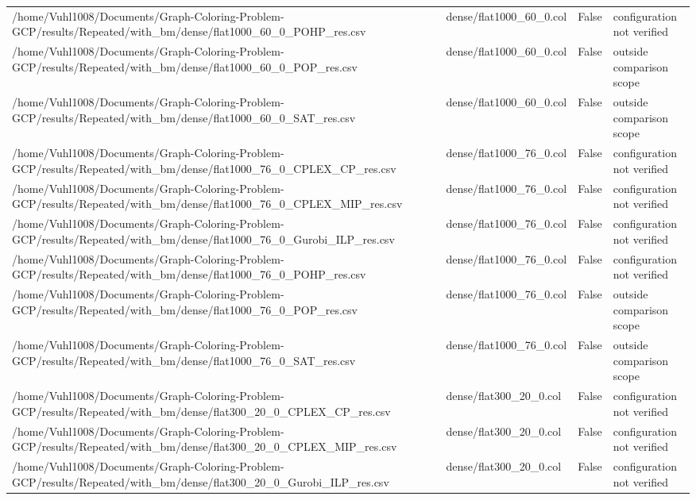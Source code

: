 \begin{table}[htbp]
\begin{tabular}{llll}
/home/Vuhl1008/Documents/Graph-Coloring-Problem-GCP/results/Repeated/with\_bm/dense/flat1000\_60\_0\_POHP\_res.csv & dense/flat1000\_60\_0.col & False & configuration not verified \\
/home/Vuhl1008/Documents/Graph-Coloring-Problem-GCP/results/Repeated/with\_bm/dense/flat1000\_60\_0\_POP\_res.csv & dense/flat1000\_60\_0.col & False & outside comparison scope \\
/home/Vuhl1008/Documents/Graph-Coloring-Problem-GCP/results/Repeated/with\_bm/dense/flat1000\_60\_0\_SAT\_res.csv & dense/flat1000\_60\_0.col & False & outside comparison scope \\
/home/Vuhl1008/Documents/Graph-Coloring-Problem-GCP/results/Repeated/with\_bm/dense/flat1000\_76\_0\_CPLEX\_CP\_res.csv & dense/flat1000\_76\_0.col & False & configuration not verified \\
/home/Vuhl1008/Documents/Graph-Coloring-Problem-GCP/results/Repeated/with\_bm/dense/flat1000\_76\_0\_CPLEX\_MIP\_res.csv & dense/flat1000\_76\_0.col & False & configuration not verified \\
/home/Vuhl1008/Documents/Graph-Coloring-Problem-GCP/results/Repeated/with\_bm/dense/flat1000\_76\_0\_Gurobi\_ILP\_res.csv & dense/flat1000\_76\_0.col & False & configuration not verified \\
/home/Vuhl1008/Documents/Graph-Coloring-Problem-GCP/results/Repeated/with\_bm/dense/flat1000\_76\_0\_POHP\_res.csv & dense/flat1000\_76\_0.col & False & configuration not verified \\
/home/Vuhl1008/Documents/Graph-Coloring-Problem-GCP/results/Repeated/with\_bm/dense/flat1000\_76\_0\_POP\_res.csv & dense/flat1000\_76\_0.col & False & outside comparison scope \\
/home/Vuhl1008/Documents/Graph-Coloring-Problem-GCP/results/Repeated/with\_bm/dense/flat1000\_76\_0\_SAT\_res.csv & dense/flat1000\_76\_0.col & False & outside comparison scope \\
/home/Vuhl1008/Documents/Graph-Coloring-Problem-GCP/results/Repeated/with\_bm/dense/flat300\_20\_0\_CPLEX\_CP\_res.csv & dense/flat300\_20\_0.col & False & configuration not verified \\
/home/Vuhl1008/Documents/Graph-Coloring-Problem-GCP/results/Repeated/with\_bm/dense/flat300\_20\_0\_CPLEX\_MIP\_res.csv & dense/flat300\_20\_0.col & False & configuration not verified \\
/home/Vuhl1008/Documents/Graph-Coloring-Problem-GCP/results/Repeated/with\_bm/dense/flat300\_20\_0\_Gurobi\_ILP\_res.csv & dense/flat300\_20\_0.col & False & configuration not verified \\

\end{tabular}
\end{table}
